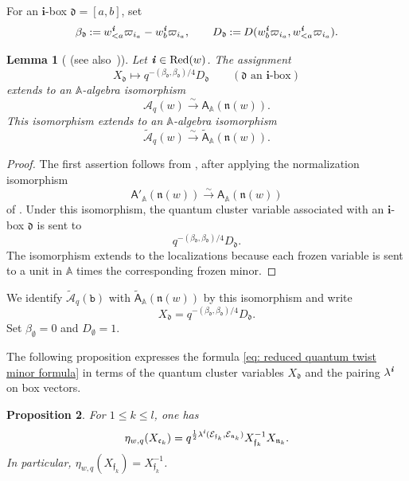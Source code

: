 \documentclass[12pt, leqno]{amsart}
\numberwithin{equation}{section}
\theoremstyle{plain}
\newtheorem{lemma}{Lemma}[section]
\newtheorem{proposition}[lemma]{Proposition}
\theoremstyle{definition}
\renewcommand{\le}{\leqslant}
\newcommand{\seteq}{\mathbin{:=}}
\newcommand{\n}{\mathfrak{n}}
\newcommand{\ii}{ \textbf{\textit{i}}}
\newcommand{\frakc}{\mathfrak{c}}
\newcommand{\frakd}{\mathfrak{d}}
\newcommand{\frakf}{\mathfrak{f}}
\newcommand{\frakn}{\mathfrak{n}}
\newcommand{\sfA}{\mathsf{A}}
\newcommand{\tsfA}{\widetilde{\sfA}}
\newcommand{\bbA}{\mathbb{A}}
\newcommand{\bfi}{\mathbf{i}}
\newcommand{\calA}{\mathcal{A}}
\newcommand{\calE}{\mathcal{E}}
\newcommand{\tcalA}{\widetilde{\calA}}
\newcommand{\ttb}{\mathtt{b}}
\newcommand{\Red}{\mathrm{Red}}
\begin{document}
For an $\bfi$-box $\frakd=[a,b]$, set
\[
\beta_{\frakd}\seteq
w_{<a}^\ii\varpi_{i_a}-w_b^\ii\varpi_{i_a},
\qquad
D_{\frakd}\seteq
D(w_b^\ii\varpi_{i_a},w_{<a}^\ii\varpi_{i_a}).
\]

\begin{lemma}[{\cite[Theorem~7.3]{GY21} (see also~\cite[\S 8]{KKKO18})}]
\label{lem: reduced quantum box realization}
Let $\ii\in\Red(w)$.
The assignment
\[
X_{\frakd}\longmapsto
q^{-(\beta_{\frakd},\beta_{\frakd})/4}D_{\frakd}
\qquad(\frakd\text{ an }\bfi\text{-box})
\]
extends to an $\bbA$-algebra isomorphism
\[
\calA_q(w)\xrightarrow{\sim}
\sfA_\bbA(\n(w)).
\]
This isomorphism extends to an $\bbA$-algebra isomorphism
\[
\tcalA_q(w)\xrightarrow{\sim}
\tsfA_\bbA(\n(w)).
\]
\end{lemma}


\begin{proof} The first assertion follows from \cite[Theorem~7.3]{GY21}, after
applying the normalization isomorphism
\[
\sfA'_\bbA(\n(w))\xrightarrow{\sim}\sfA_\bbA(\n(w))
\]
of \cite[Remark~8.2.3 and (8.3)]{KKKO18}.
Under this isomorphism, the quantum cluster variable associated with
an $\bfi$-box $\frakd$ is sent to
\[
q^{-(\beta_{\frakd},\beta_{\frakd})/4}D_{\frakd}.
\]
The isomorphism extends to the localizations because each
frozen variable is sent to a unit in $\bbA$ times the corresponding
frozen minor.
\end{proof}


We identify $\tcalA_q(\ttb)$ with
$\tsfA_\bbA(\n(w))$ by this isomorphism and write
\begin{equation}
X_{\frakd}=
q^{-(\beta_{\frakd},\beta_{\frakd})/4}D_{\frakd}.
\label{eq: reduced quantum box normalization}
\end{equation}
Set $\beta_\emptyset=0$ and $D_\emptyset=1$.

The following proposition expresses the formula
\eqref{eq: reduced quantum twist minor formula} in terms of the
quantum cluster variables $X_{\frakd}$ and the
pairing $\lambda^\ii$ on box vectors.

\begin{proposition}
\label{prop: reduced quantum twist box vectors}
For $1\le k\le l$, one has
\begin{equation}
\eta_{w,q}(X_{\frakc_k})
=q^{\frac12\lambda^\ii(\calE_{\frakf_k},\calE_{\frakn_k})}
X_{\frakf_k}^{-1}X_{\frakn_k}.
\label{eq: reduced quantum twist box vectors}
\end{equation}
In particular,
$\eta_{w,q}(X_{\frakf_k})=X_{\frakf_k}^{-1}$.
\end{proposition}
\end{document}
